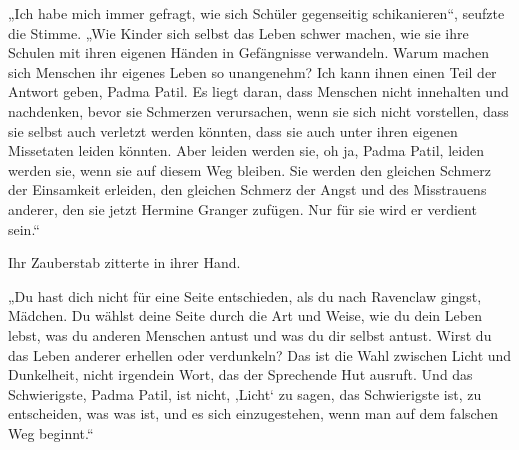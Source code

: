 „Ich habe mich immer gefragt, wie sich Schüler gegenseitig schikanieren“, seufzte die Stimme.
„Wie Kinder sich selbst das Leben schwer machen, wie sie ihre Schulen mit ihren eigenen Händen in Gefängnisse verwandeln. Warum machen sich Menschen ihr eigenes Leben so unangenehm? Ich kann ihnen einen Teil der Antwort geben, Padma Patil. Es liegt daran, dass Menschen nicht innehalten und nachdenken, bevor sie Schmerzen verursachen, wenn sie sich nicht vorstellen, dass sie selbst auch verletzt werden könnten, dass sie auch unter ihren eigenen Missetaten leiden könnten. Aber leiden werden sie, oh ja, Padma Patil, leiden werden sie, wenn sie auf diesem Weg bleiben. Sie werden den gleichen Schmerz der Einsamkeit erleiden, den gleichen Schmerz der Angst und des Misstrauens anderer, den sie jetzt Hermine Granger zufügen. Nur für sie wird er verdient sein.“

Ihr Zauberstab zitterte in ihrer Hand.

„Du hast dich nicht für eine Seite entschieden, als du nach Ravenclaw gingst, Mädchen. Du wählst deine Seite durch die Art und Weise, wie du dein Leben lebst, was du anderen Menschen antust und was du dir selbst antust. Wirst du das Leben anderer erhellen oder verdunkeln? Das ist die Wahl zwischen Licht und Dunkelheit, nicht irgendein Wort, das der Sprechende Hut ausruft. Und das Schwierigste, Padma Patil, ist nicht, ‚Licht‘ zu sagen, das Schwierigste ist, zu entscheiden, was was ist, und es sich einzugestehen, wenn man auf dem falschen Weg beginnt.“

